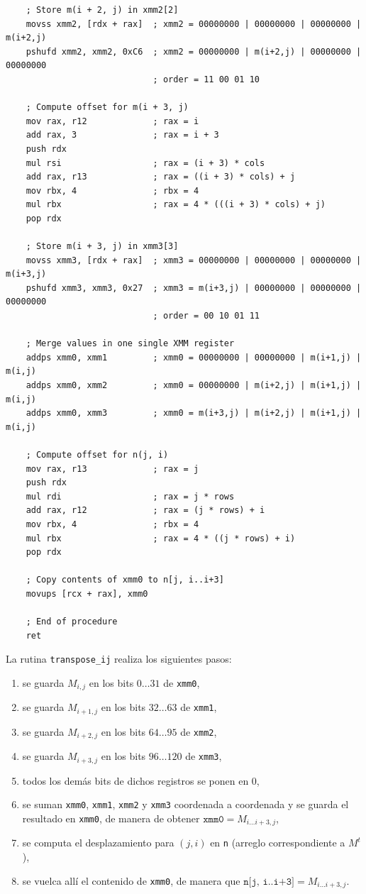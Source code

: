 \documentclass[a4paper, 10pt, twoside]{article}
\newcommand{\cc}[1]{\texttt{#1}}
\begin{document}
\begin{verbatim}
    ; Store m(i + 2, j) in xmm2[2]
    movss xmm2, [rdx + rax]  ; xmm2 = 00000000 | 00000000 | 00000000 | m(i+2,j)
    pshufd xmm2, xmm2, 0xC6  ; xmm2 = 00000000 | m(i+2,j) | 00000000 | 00000000
                             ; order = 11 00 01 10

    ; Compute offset for m(i + 3, j)
    mov rax, r12             ; rax = i
    add rax, 3               ; rax = i + 3
    push rdx
    mul rsi                  ; rax = (i + 3) * cols
    add rax, r13             ; rax = ((i + 3) * cols) + j
    mov rbx, 4               ; rbx = 4
    mul rbx                  ; rax = 4 * (((i + 3) * cols) + j)
    pop rdx

    ; Store m(i + 3, j) in xmm3[3]
    movss xmm3, [rdx + rax]  ; xmm3 = 00000000 | 00000000 | 00000000 | m(i+3,j)
    pshufd xmm3, xmm3, 0x27  ; xmm3 = m(i+3,j) | 00000000 | 00000000 | 00000000
                             ; order = 00 10 01 11

    ; Merge values in one single XMM register
    addps xmm0, xmm1         ; xmm0 = 00000000 | 00000000 | m(i+1,j) |   m(i,j)
    addps xmm0, xmm2         ; xmm0 = 00000000 | m(i+2,j) | m(i+1,j) |   m(i,j)
    addps xmm0, xmm3         ; xmm0 = m(i+3,j) | m(i+2,j) | m(i+1,j) |   m(i,j)

    ; Compute offset for n(j, i)
    mov rax, r13             ; rax = j
    push rdx
    mul rdi                  ; rax = j * rows
    add rax, r12             ; rax = (j * rows) + i
    mov rbx, 4               ; rbx = 4
    mul rbx                  ; rax = 4 * ((j * rows) + i)
    pop rdx

    ; Copy contents of xmm0 to n[j, i..i+3]
    movups [rcx + rax], xmm0

    ; End of procedure
    ret
\end{verbatim}

La rutina \cc{transpose\_ij} realiza los siguientes pasos:

\begin{enumerate}
  \item se guarda $M_{i,j}$ en los bits $0 \dots 31$ de \cc{xmm0},
  \item se guarda $M_{i+1,j}$ en los bits $32 \dots 63$ de \cc{xmm1},
  \item se guarda $M_{i+2,j}$ en los bits $64 \dots 95$ de \cc{xmm2},
  \item se guarda $M_{i+3,j}$ en los bits $96 \dots 120$ de \cc{xmm3},
  \item todos los demás bits de dichos registros se ponen en $0$,
  \item se suman \cc{xmm0}, \cc{xmm1}, \cc{xmm2} y \cc{xmm3} coordenada a
    coordenada y se guarda el resultado en \cc{xmm0}, de manera de obtener
    $\cc{xmm0} = M_{i \ldots i+3,j}$,
  \item se computa el desplazamiento para $(j,i)$ en \cc{n} (arreglo
    correspondiente a $M^t$),
  \item se vuelca allí el contenido de \cc{xmm0}, de manera que $\cc{n[j,
    i..i+3]} = M_{i \ldots i+3,j}$.
\end{enumerate}
\end{document}
